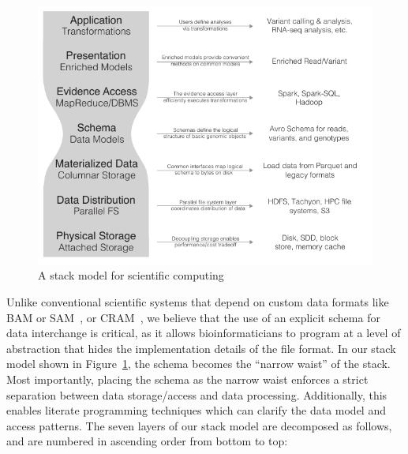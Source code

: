 \documentclass[phd]{ucbthesis}
\begin{document}
\begin{figure}[h]
\begin{center}
\includegraphics{graphs/expanded-stack-2.pdf}
\end{center}
\caption{A stack model for scientific computing}
\label{fig:stack-model}
\end{figure}

Unlike conventional scientific systems that depend on custom data formats like BAM or SAM~\cite{li09},
or CRAM~\cite{fritz11}, we believe that the use of an explicit schema for data interchange is critical,
as it allows bioinformaticians to program at a level of abstraction that hides the implementation details
of the file format.
In our stack model shown in Figure~\ref{fig:stack-model}, the schema becomes the ``narrow waist''
of the stack. Most importantly, placing the schema as the narrow waist enforces a strict separation
between data storage/access and data processing. Additionally, this enables literate programming
techniques which can clarify the data model and access patterns. The seven layers of our stack model
are decomposed as follows, and are numbered in ascending order from bottom to top:
\end{document}
